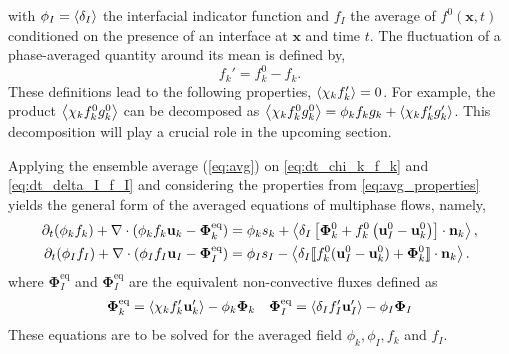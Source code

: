 with $\phi_I = \left<\delta_I\right>$ the interfacial indicator function and $f_I$ the average of $f^0(\textbf{x},t)$ conditioned on the presence of an interface at $\textbf{x}$ and time $t$. 
The fluctuation of a phase-averaged quantity around its mean is defined by,
\begin{equation}
    f_k' = f_k^0 - f_k.
    \label{eq:def_fluctu}
\end{equation}
These definitions lead to the following properties, $\left<\chi_k f'_k\right> = 0$. 
For example, the product $\left<\chi_k f^0_kg^0_k\right>$ can be decomposed as $\left<\chi_k f_k^0g_k^0\right>=\phi_k f_kg_k + \left<\chi_k f'_kg'_k\right>$. 
This decomposition will play a crucial role in the upcoming section. 


Applying the ensemble average (\ref{eq:avg}) on \ref{eq:dt_chi_k_f_k} and \ref{eq:dt_delta_I_f_I} and considering the properties from \ref{eq:avg_properties} yields the general form of the averaged equations of multiphase flows, namely,
\begin{align}
    \partial_t (\phi_k f_k)
    +\mathbf{\nabla}\cdot (\phi_k f_k \textbf{u}_k - \mathbf{\Phi}_k^\text{eq})
    &= 
    \phi_k s_k
    + \left<\delta_I\left[
        \mathbf{\Phi}_k^0
        + f_k^0
        \left(
            \textbf{u}_I^0
            - \textbf{u}_k^0
        \right)
    \right]
    \cdot \textbf{n}_k\right> ,
    \label{eq:avg_dt_chi_f}\\
    \partial_t (\phi_I f_I)
    +\mathbf{\nabla}\cdot (\phi_I f_I \textbf{u}_I- \mathbf{\Phi}_{I}^\text{eq})
    &= 
    \phi_I s_I
    - \left<\delta_I 
    \llbracket 
    f_k^0 (\textbf{u}_I^0 - \textbf{u}_k^0)
    + \mathbf{\Phi}_k^0
     \rrbracket \cdot \textbf{n}_k 
     \right>.
    \label{eq:avg_dt_delta_f}
\end{align}
where $\mathbf{\Phi}_{I}^\text{eq}$ and $\mathbf{\Phi}_{I}^\text{eq}$ are the equivalent non-convective fluxes defined as 
\begin{align*}
    \mathbf{\Phi}_k^\text{eq}
    = \left<\chi_k f_k' \textbf{u}_k'\right>
    - \phi_k \bm\Phi_k
    &&
    \mathbf{\Phi}_{I}^\text{eq}
    = \left<\delta_I f_I' \textbf{u}_I'\right>
    - \phi_I \bm\Phi_I
\end{align*}
These equations are to be solved for the averaged field $\phi_k,\phi_I,f_k$ and $f_I$. 

